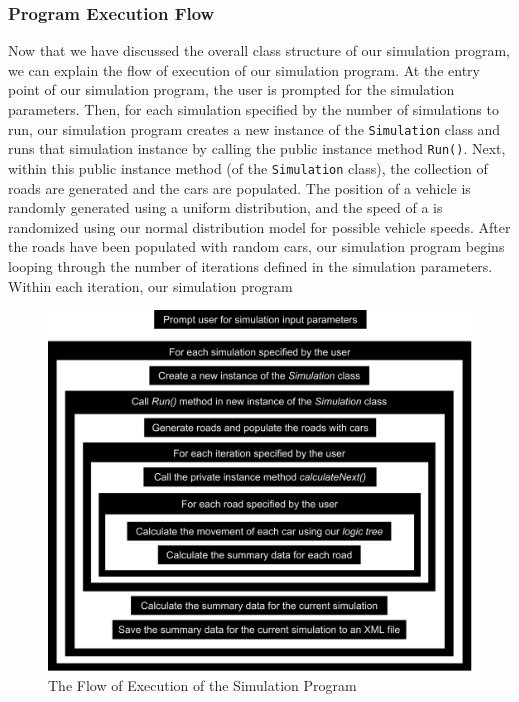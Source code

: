 \documentclass{amsart}
\begin{document}
		\subsubsection{Program Execution Flow}		
			Now that we have discussed the overall class structure of our simulation program, we can explain the flow of execution of our simulation program. At the entry point of our simulation program, the user is prompted for the simulation parameters. Then, for each simulation specified by the number of simulations to run, our simulation program creates a new instance of the \texttt{Simulation} class and runs that simulation instance by calling the public instance method \texttt{Run()}. Next, within this public instance method (of the \texttt{Simulation} class), the collection of roads are generated and the cars are populated. The position of a vehicle is randomly generated using a uniform distribution, and the speed of a is randomized using our normal distribution model for possible vehicle speeds. After the roads have been populated with random cars, our simulation program begins looping through the number of iterations defined in the simulation parameters. Within each iteration, our simulation program 
\begin{figure}[h]
\centering
\includegraphics[scale=0.49]{MCMProgramFlow}
\caption{The Flow of Execution of the Simulation Program}
\label{MCMProgramFlow}
\end{figure}
\end{document}
